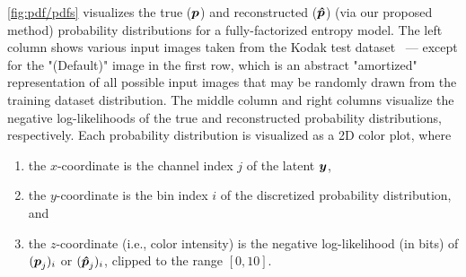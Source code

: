 \cref{fig:pdf/pdfs} visualizes the true (${\boldsymbol{p}}$) and reconstructed (${\boldsymbol{\hat{p}}}$) (via our proposed method) probability distributions for a fully-factorized entropy model.
The left column shows various input images taken from the Kodak test dataset~\cite{kodak_dataset} --- except for the "(Default)" image in the first row, which is an abstract "amortized" representation of all possible input images that may be randomly drawn from the training dataset distribution.
The middle column and right columns visualize the negative log-likelihoods of the true and reconstructed probability distributions, respectively.
Each probability distribution is visualized as a 2D color plot, where
\begin{enumerate}[label=(\roman*), noitemsep, topsep=0pt]
  \item the $x$-coordinate is the channel index $j$ of the latent ${\boldsymbol{y}}$,
  \item the $y$-coordinate is the bin index $i$ of the discretized probability distribution, and
  \item the $z$-coordinate (i.e., color intensity) is the negative log-likelihood (in bits) of $({\boldsymbol{p}}_j)_i$ or $({\boldsymbol{\hat{p}}}_j)_i$, clipped to the range $[0, 10]$.
\end{enumerate}



